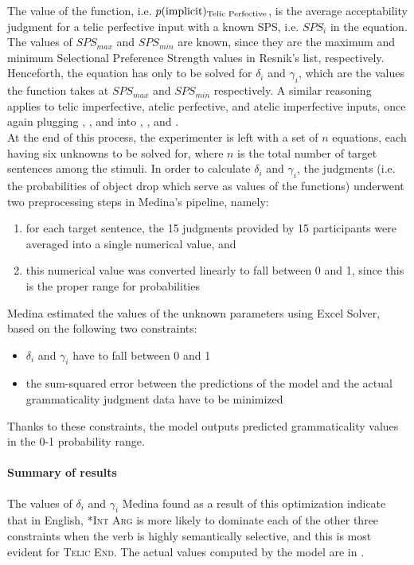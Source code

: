 The value of the function, i.e. $p(\text{implicit})\textsubscript{Telic Perfective}$, is the average acceptability judgment for a telic perfective input with a known SPS, i.e. $SPS_{i}$ in the equation. The values of $SPS_{max}$ and $SPS_{min}$ are known, since they are the maximum and minimum Selectional Preference Strength values in Resnik's list, respectively. Henceforth, the equation has only to be solved for $\delta_i$ and $\gamma_i$, which are the values the function takes at $SPS_{max}$ and $SPS_{min}$ respectively. A similar reasoning applies to telic imperfective, atelic perfective, and atelic imperfective inputs, once again plugging , , and  into , , and .\\
At the end of this process, the experimenter is left with a set of $n$ equations, each having six unknowns to be solved for, where $n$ is the total number of target sentences among the stimuli. In order to calculate $\delta_i$ and $\gamma_i$, the judgments (i.e. the probabilities of object drop which serve as values of the functions) underwent two preprocessing steps in Medina's pipeline, namely:
\begin{enumerate}
    \item for each target sentence, the 15 judgments provided by 15 participants were averaged into a single numerical value, and
    \item this numerical value was converted linearly to fall between 0 and 1, since this is the proper range for probabilities
\end{enumerate}

Medina estimated the values of the unknown parameters using Excel Solver, based on the following two constraints: 
\begin{itemize}
    \item $\delta_i$ and $\gamma_i$ have to fall between 0 and 1
    \item the sum-squared error between the predictions of the model and the actual grammaticality judgment data have to be minimized
\end{itemize}
Thanks to these constraints, the model outputs predicted grammaticality values in the 0-1 probability range.

\paragraph{Summary of results} The values of $\delta_i$ and $\gamma_i$ Medina found as a result of this optimization indicate that in English, \textsc{*Int Arg} is more likely to dominate each of the other three constraints when the verb is highly semantically selective, and this is most evident for \textsc{Telic End}. The actual values computed by the model are in .

